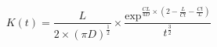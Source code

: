 \begin{equation}
K(t) = \frac{L}{2 \times (\pi D)^{\frac{1}{2}}} \times \frac{\text{exp}^{\frac{CL}{4D} \times \left(2-\frac{L}{Ct}- \frac{Ct}{L} \right) } }{t^{\frac{3}{2}}}
\end{equation}


